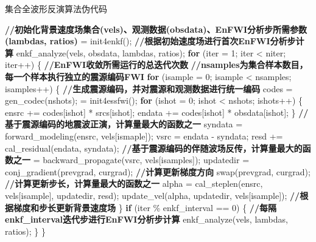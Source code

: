 \documentclass[degree=doctor]{thuthesis}
\begin{document}
\begin{algorithm}[ht]
\small
\caption{集合全波形反演算法伪代码}\label{alg:enfwicode}
\begin{algorithmic}[1]
\State \textbf{//初始化背景速度场集合(vels)、观测数据(obsdata)、EnFWI分析步所需参数(lambdas, ratios)}
 = init4enkf(); \label{ln:enfwiinit}
\State
\State \textbf{//根据初始速度场进行首次EnFWI分析步计算}
\State enkf\_analyze(vels, obsdata, lambdas, ratios); \label{ln:enfwi1enkf}
\State
\State \textbf{for} (iter = 1; iter < niter; iter++) \{ \textbf{//EnFWI收敛所需运行的总迭代次数} \label{ln:enfwiiter}
\State
\State \quad\quad \textbf{//nsamples为集合样本数目，每一个样本执行独立的震源编码FWI}
\State \quad\quad \textbf{for} (isample = 0; isample < nsamples; isamples++) \{ \label{ln:enfwisample}
\State \quad\quad\quad\quad \textbf{//生成震源编码，并对震源和观测数据进行统一编码}
\State \quad\quad\quad\quad codes = gen\_codec(nshots); \label{ln:enfwicodec}
\State \quad\quad\quad{} = init4essfwi();
\State \quad\quad\quad\quad \textbf{for} (ishot = 0; ishot < nshots; ishots++) \{
\State \quad\quad\quad\quad\quad\quad ensrc += codes[ishot] * srcs[ishot];
\State \quad\quad\quad\quad\quad\quad endata += codes[ishot] * obsdata[ishot];
\State \quad\quad\quad\quad \} \label{ln:enfwicodecend}
\State
\State \quad\quad\quad\quad \textbf{//基于震源编码的地震波正演，计算量最大的函数之一}
\State \quad\quad\quad\quad syndata = forward\_modeling(ensrc, vels[ismaple]); \label{ln:enfwiforward}
\State \quad\quad\quad\quad vsrc = endata - syndata; \label{ln:vsrc}
\State \quad\quad\quad\quad resd += cal\_residual(endata, syndata); \label{ln:resd}
\State
\State \quad\quad\quad\quad \textbf{//基于震源编码的伴随波场反传，计算量最大的函数之一}
\State \quad\quad\quad{} = backward\_propagate(vsrc, vels[isamples]); \label{ln:enfwibackward}
\State \quad\quad\quad\quad updatedir = conj\_gradient(prevgrad, curgrad); \textbf{//计算更新梯度方向}
\State \quad\quad\quad\quad swap(prevgrad, curgrad);
\State
\State \quad\quad\quad\quad \textbf{//计算更新步长，计算量最大的函数之一}
\State \quad\quad\quad\quad alpha = cal\_steplen(ensrc, vels[isample], updatedir, resd);
\State \quad\quad\quad\quad update\_vel(alpha, updatedir, vels[isample]); \textbf{//根据梯度和步长更新背景速度场} \label{ln:enfwibackwardend}
\State \quad\quad \} \label{ln:enfwisampleend}
\State
\State \quad\quad \textbf{if} (iter \% enkf\_interval == 0) \{ \textbf{//每隔enkf\_interval迭代步进行EnFWI分析步计算} \label{ln:enfwienkfbegin}
\State \quad\quad\quad\quad enkf\_analyze(vels, lambdas, ratios);
\State \quad\quad \} \label{ln:enfwienkfend}
\State \} \label{ln:enfwiiterend}
\end{algorithmic}
\end{algorithm}
\end{document}
